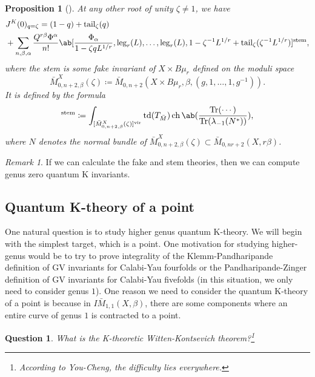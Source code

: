 \documentclass{amsart}
\newtheorem{prop}[thm]{Proposition}
\newtheorem{quest}[thm]{Question}
\theoremstyle{definition}
\theoremstyle{remark}
\newtheorem{rmk}[thm]{Remark}
\theoremstyle{plain}
\theoremstyle{definition}
\theoremstyle{remark}
\newcommand{\mr}[1]{\mathrm{#1}}
\newcommand{\on}[1]{\operatorname{#1}}
\newcommand{\1}{\mathbf{1}}
\newcommand{\2}{\mathbf{2}}
\newcommand{\3}{\mathbf{3}}
\newcommand{\vir}{\mr{vir}}
\begin{document}
\begin{prop}[{\cite{GiventalTonita2014}}]
    At any other root of unity \(\zeta \neq 1\), we have
    \begin{align*}
        &J^K(0)_{q = \zeta} = (1-q) + \mr{tail}_{\zeta}(q) \\
        &+ \sum_{n,\beta,\alpha} \frac{Q^{r\beta}\Phi^{\alpha}}{n!} \ab[\frac{\Phi_{\alpha}}{1-\zeta q L^{1/r}}, \mr{leg}_r(L), \ldots, \mr{leg}_r(L), 1 - \zeta^{-1}L^{1/r} + \mr{tail}_{\zeta}(\zeta^{-1} L^{1/r})]^{\mr{stem}},
    \end{align*}
    where the stem is some fake invariant of \(X \times B\mu_r\) defined on the moduli space
    \[ \bar{M}_{0,n+2,\beta}^X(\zeta) \coloneqq \bar{M}_{0,n+2}(X \times B\mu_r, \beta, (g, 1, \ldots, 1, g^{-1})). \]
    It is defined by the formula
    \begin{align*}
        [\cdots]^{\mr{stem}} \coloneqq \int_{[\bar{M}_{0,n+2,\beta}^X(\zeta)]^{\vir}} \on{td}(T_{\bar{M}}) \on{ch}\ab(\frac{\on{Tr}(\cdots)}{\on{Tr}(\lambda_{-1}(N^*))}), 
    \end{align*}
    where \(N\) denotes the normal bundle of \(\bar{M}_{0,n+2,\beta}^X(\zeta) \subset \bar{M}_{0,nr+2}(X, r\beta)\).
\end{prop}

\begin{rmk}
    If we can calculate the fake and stem theories, then we can compute genus zero quantum K invariants.
\end{rmk}

\subsection{Quantum K-theory of a point}%
\label{sub:Quantum K-theory of a point}

One natural question is to study higher genus quantum K-theory. We will begin with the simplest target, which is a point. One motivation for studying higher-genus would be to try to prove integrality of the Klemm-Pandharipande definition of GV invariants for Calabi-Yau fourfolds or the Pandharipande-Zinger definition of GV invariants for Calabi-Yau fivefolds (in this situation, we only need to consider genus \(1\)). One reason we need to consider the quantum K-theory of a point is because in \(I\bar{M}_{1,1}(X, \beta)\), there are some components where an entire curve of genus \(1\) is contracted to a point.

\begin{quest}
    What is the K-theoretic Witten-Kontsevich theorem?\footnote{According to You-Cheng, the difficulty lies everywhere.}
\end{quest}
\end{document}
